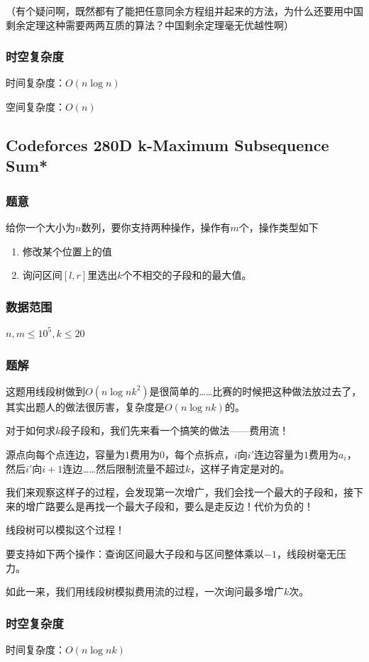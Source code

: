 \documentclass{ctexart}
\begin{document}
（有个疑问啊，既然都有了能把任意同余方程组并起来的方法，为什么还要用中国剩余定理这种需要两两互质的算法？中国剩余定理毫无优越性啊）
\subsubsection{时空复杂度}
时间复杂度：$O(n \log n)$

空间复杂度：$O(n)$
\subsection{Codeforces 280D k-Maximum Subsequence Sum*}
\subsubsection{题意}
给你一个大小为$n$数列，要你支持两种操作，操作有$m$个，操作类型如下
\begin{enumerate}
\item 修改某个位置上的值
\item 询问区间$[l,r]$里选出$k$个不相交的子段和的最大值。
\end{enumerate}
\subsubsection{数据范围}
$n,m \le 10^5,k \le 20$
\subsubsection{题解}
这题用线段树做到$O(n \log n k^2)$是很简单的……比赛的时候把这种做法放过去了，其实出题人的做法很厉害，复杂度是$O(n \log n k)$的。

对于如何求$k$段子段和，我们先来看一个搞笑的做法——费用流！

源点向每个点连边，容量为$1$费用为$0$，每个点拆点，$i$向$i'$连边容量为$1$费用为$a_i$，然后$i'$向$i+1$连边……然后限制流量不超过$k$，这样子肯定是对的。

我们来观察这样子的过程，会发现第一次增广，我们会找一个最大的子段和，接下来的增广路要么是再找一个最大子段和，要么是走反边！代价为负的！

线段树可以模拟这个过程！

要支持如下两个操作：查询区间最大子段和与区间整体乘以$-1$，线段树毫无压力。

如此一来，我们用线段树模拟费用流的过程，一次询问最多增广$k$次。
\subsubsection{时空复杂度}
时间复杂度：$O(n \log n k)$
\end{document}
